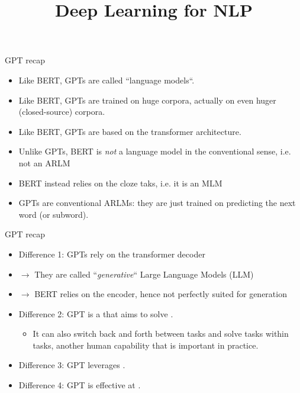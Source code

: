 \documentclass[11pt,compress,t,notes=noshow, xcolor=table]{beamer}
\title{Deep Learning for NLP}
\begin{document}


\begin{frame}{GPT recap}

\vfill

  \begin{itemize}
\item Like BERT, GPTs are called ``language models``.
\item Like BERT, GPTs are trained on huge corpora, actually on even huger (closed-source) corpora.
\item Like BERT, GPTs are based on the transformer architecture.
\item Unlike GPTs, BERT is \textit{not} a language model in the conventional sense, i.e. not an ARLM
\item BERT instead relies on the cloze taks, i.e. it is an MLM
\item GPTs are conventional ARLMs: they are just trained on predicting the next word (or subword).
    \end{itemize}

\vfill

\end{frame}


\begin{frame}{GPT recap}

\vfill

  \begin{itemize}
\item Difference 1: GPTs rely on the transformer decoder
\item[] $\to$ They are called ``\textit{generative}`` Large Language Models (LLM)
\item[] $\to$ BERT relies on the encoder, hence not perfectly suited for generation
\item Difference 2: GPT is a  that aims to solve .  
  \begin{itemize}
    \item It can also switch back and forth between tasks and solve
    tasks within tasks, another human capability that is
    important in practice. 
    \end{itemize}
\item Difference 3: GPT leverages .
\item Difference 4: GPT is effective at .
    \end{itemize}

\vfill

\end{frame}
\end{document}
